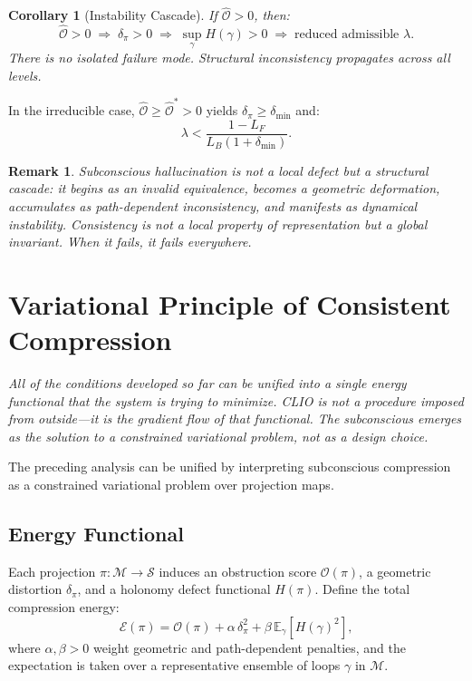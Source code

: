 \documentclass[12pt,a4paper]{article}
\newtheorem{corollary}[theorem]{Corollary}
\newtheorem{remark}[theorem]{Remark}
\begin{document}
\begin{corollary}[Instability Cascade]
If $\hat{\mathcal{O}} > 0$, then:
\[
\hat{\mathcal{O}} > 0 \;\Rightarrow\; \delta_\pi > 0 \;\Rightarrow\; \sup_\gamma H(\gamma) > 0 \;\Rightarrow\; \text{reduced admissible } \lambda.
\]
There is no isolated failure mode. Structural inconsistency propagates across all levels.
\end{corollary}

In the irreducible case, $\hat{\mathcal{O}} \geq \hat{\mathcal{O}}^* > 0$ yields $\delta_\pi \geq \delta_{\min}$ and:
\[
\lambda < \frac{1 - L_F}{L_B (1 + \delta_{\min})}.
\]

\begin{remark}
Subconscious hallucination is not a local defect but a structural cascade: it begins as an invalid equivalence, becomes a geometric deformation, accumulates as path-dependent inconsistency, and manifests as dynamical instability. Consistency is not a local property of representation but a global invariant. When it fails, it fails everywhere.
\end{remark}

\section{Variational Principle of Consistent Compression}
\label{sec:variational}

\textit{All of the conditions developed so far can be unified into a single energy functional that the system is trying to minimize. CLIO is not a procedure imposed from outside---it is the gradient flow of that functional. The subconscious emerges as the solution to a constrained variational problem, not as a design choice.}

The preceding analysis can be unified by interpreting subconscious compression as a constrained variational problem over projection maps.

\subsection{Energy Functional}

Each projection $\pi : \mathcal{M} \to \mathcal{S}$ induces an obstruction score $\mathcal{O}(\pi)$, a geometric distortion $\delta_\pi$, and a holonomy defect functional $H(\pi)$. Define the total compression energy:
\[
\mathcal{E}(\pi) = \mathcal{O}(\pi) + \alpha\, \delta_\pi^2 + \beta\, \mathbb{E}_{\gamma}[H(\gamma)^2],
\]
where $\alpha, \beta > 0$ weight geometric and path-dependent penalties, and the expectation is taken over a representative ensemble of loops $\gamma$ in $\mathcal{M}$.
\end{document}

